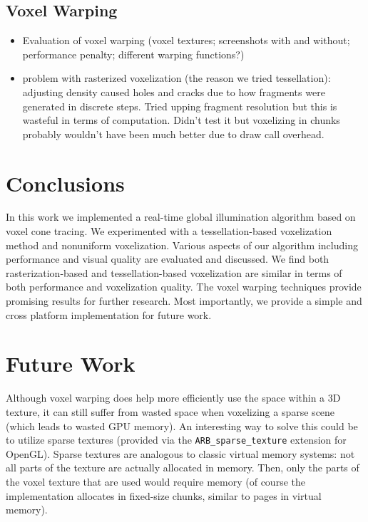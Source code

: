 \subsection{Voxel Warping}


\begin{itemize}
    \item Evaluation of voxel warping (voxel textures; screenshots with and without; performance penalty; different warping functions?)
    \item problem with rasterized voxelization (the reason we tried tessellation): adjusting density caused holes and cracks due to how fragments were generated in discrete steps. Tried upping fragment resolution but this is wasteful in terms of computation. Didn't test it but voxelizing in chunks probably wouldn't have been much better due to draw call overhead.
\end{itemize}


\section{Conclusions}
In this work we implemented a real-time global illumination algorithm based on voxel cone tracing. We experimented with a tessellation-based voxelization method and nonuniform voxelization. Various aspects of our algorithm including performance and visual quality are evaluated and discussed. We find both rasterization-based and tessellation-based voxelization are similar in terms of both performance and voxelization quality. The voxel warping techniques provide promising results for further research. Most importantly, we provide a simple and cross platform implementation for future work.

\section{Future Work}
Although voxel warping does help more efficiently use the space within a 3D texture, it can still suffer from wasted space when voxelizing a sparse scene (which leads to wasted GPU memory). An interesting way to solve this could be to utilize sparse textures (provided via the \verb#ARB_sparse_texture# extension for OpenGL). Sparse textures are analogous to classic virtual memory systems: not all parts of the texture are actually allocated in memory. Then, only the parts of the voxel texture that are used would require memory (of course the implementation allocates in fixed-size chunks, similar to pages in virtual memory).

